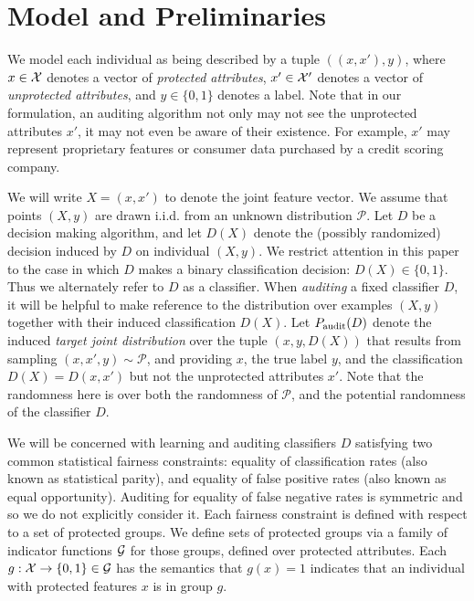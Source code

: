 \section{Model and Preliminaries}

We model each individual as being described by a tuple $((x, x'), y)$,
where $x\in \mathcal{X}$ denotes a vector of \emph{protected attributes},
$x'\in \mathcal{X}'$ denotes a vector of \emph{unprotected attributes}, and
$y\in \{0, 1\}$ denotes a label. Note that in our formulation, an
auditing algorithm not only may not see the unprotected attributes
$x'$, it may not even be aware of their existence. For example, $x'$
may represent proprietary features or consumer data purchased by a
credit scoring company.

We will write $X = (x, x')$ to denote the joint feature vector. We
assume that points $(X, y)$ are drawn i.i.d. from an unknown
distribution $\mathcal{P}$.  Let $D$ be a decision making algorithm,
and let $D(X)$ denote the (possibly randomized) decision induced by
$D$ on individual $(X,y)$. We restrict attention in this paper to the
case in which $D$ makes a binary classification decision:
$D(X) \in \{0,1\}$. Thus we alternately refer to $D$ as a classifier.
When \emph{auditing} a fixed classifier $D$, it will be helpful to
make reference to the distribution over examples $(X, y)$ together
with their induced classification $D(X)$. Let $P_\mathrm{audit}(D)$ denote the
induced \emph{target joint distribution} over the tuple $(x, y, D(X))$
that results from sampling $(x, x', y) \sim \mathcal{P}$, and
providing $x$, the true label $y$, and the classification
$D(X) = D(x,x')$ but not the unprotected attributes $x'$.  Note that
the randomness here is over both the randomness of $\mathcal{P}$, and
the potential randomness of the classifier $D$.


We will be concerned with learning and auditing classifiers $D$
satisfying two common statistical fairness constraints: equality of
classification rates (also known as statistical parity), and equality
of false positive rates (also known as equal opportunity). Auditing
for equality of false negative rates is symmetric and so we do not
explicitly consider it. Each fairness constraint is defined with
respect to a set of protected groups. We define sets of protected
groups via a family of indicator functions $\mathcal{G}$ for those groups,
defined over protected attributes. Each $g:\mathcal{X} \to \{0,1\} \in \mathcal{G}$
has the semantics that $g(x) = 1$ indicates that an individual with
protected features $x$ is in group $g$.


